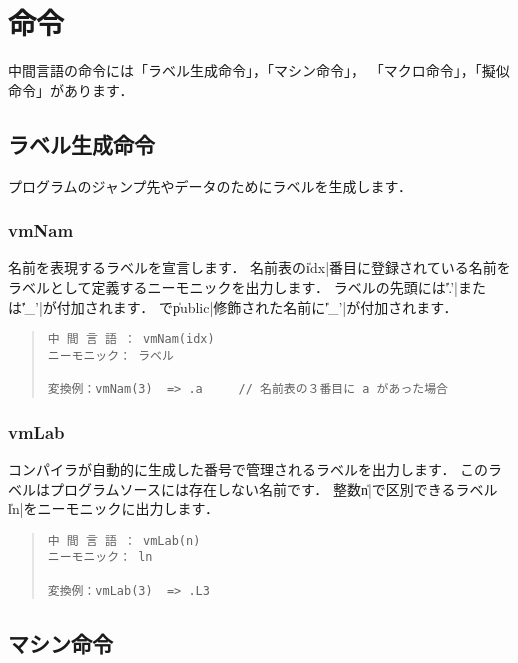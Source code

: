 \section{命令}

中間言語の命令には「ラベル生成命令」，「マシン命令」，
「マクロ命令」，「擬似命令」があります．

\subsection{ラベル生成命令}

プログラムのジャンプ先やデータのためにラベルを生成します．

\subsubsection{vmNam}

名前を表現するラベルを宣言します．
名前表の\|idx|番目に登録されている名前を
ラベルとして定義するニーモニックを出力します．
ラベルの先頭には\|'.'|または\|'_'|が付加されます．
\cmml で\|public|修飾された名前に\|'_'|が付加されます．

\begin{quote}
\begin{verbatim}
中 間 言 語 ： vmNam(idx)
ニーモニック： ラベル

変換例：vmNam(3)  => .a     // 名前表の３番目に a があった場合
\end{verbatim}
\end{quote}

\subsubsection{vmLab}

コンパイラが自動的に生成した番号で管理されるラベルを出力します．
このラベルは\cmm プログラムソースには存在しない名前です．
整数\|n|で区別できるラベル\|ln|をニーモニックに出力します．

\begin{quote}
\begin{verbatim}
中 間 言 語 ： vmLab(n)
ニーモニック： ln

変換例：vmLab(3)  => .L3
\end{verbatim}
\end{quote}

\subsection{マシン命令}

